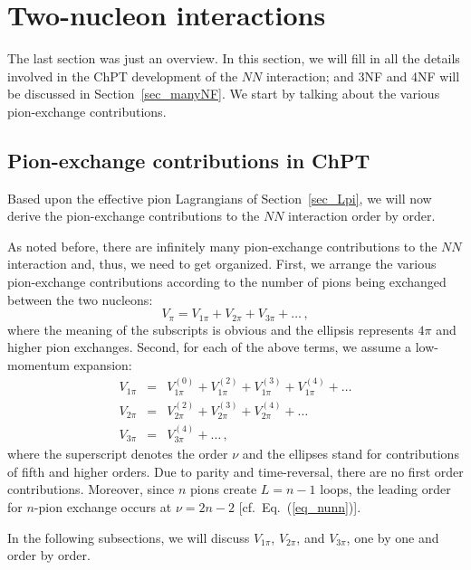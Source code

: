 \documentclass[sort&compress,preprint,3p]{elsarticle}
\begin{document}
\section{Two-nucleon interactions
\label{sec_2NF}}

The last section was just an overview.
In this section, 
we will fill in all the details involved in the
ChPT development of the $NN$ interaction; and 3NF and 4NF
will be discussed in Section~\ref{sec_manyNF}.
We start by talking about the various pion-exchange
contributions.

\subsection{Pion-exchange contributions in ChPT \label{sec_pi}}

Based upon the effective pion Lagrangians of Section~\ref{sec_Lpi},
we will now derive
the pion-exchange contributions to the $NN$ 
interaction order by order.


As noted before, there are infinitely many pion-exchange 
contributions to the $NN$ interaction and, thus, we need
to get organized.
First, we arrange the various pion-exchange contributions 
according to the number of pions being exchanged between the two
nucleons:
\begin{equation}
V_\pi = V_{1\pi} + V_{2\pi} + V_{3\pi} + \ldots \,,
\end{equation}
where the meaning of the subscripts is obvious
and
the ellipsis represents $4\pi$ and higher pion exchanges.
Second, for each of the above terms, we assume a 
low-momentum expansion:
\begin{eqnarray}
V_{1\pi} & = & V_{1\pi}^{(0)} + V_{1\pi}^{(2)} 
+ V_{1\pi}^{(3)} + V_{1\pi}^{(4)} + \ldots 
\label{eq_1pe_orders}
\\
V_{2\pi} & = & V_{2\pi}^{(2)} + V_{2\pi}^{(3)} + V_{2\pi}^{(4)} 
+ \ldots \\
V_{3\pi} & = & V_{3\pi}^{(4)} + \ldots \,,
\end{eqnarray}
where the superscript denotes the order $\nu$
and the ellipses stand for contributions of fifth
and higher orders.
Due to parity and time-reversal,
there are no first order contributions.
Moreover, since $n$ pions create $L=n-1$ loops, 
the leading
order for $n$-pion exchange occurs at $\nu=2n-2$
[cf.\ Eq.~(\ref{eq_nunn})].

In the following subsections, we will discuss
$V_{1\pi}$, $V_{2\pi}$, and $V_{3\pi}$,
one by one and order by order.
\end{document}
